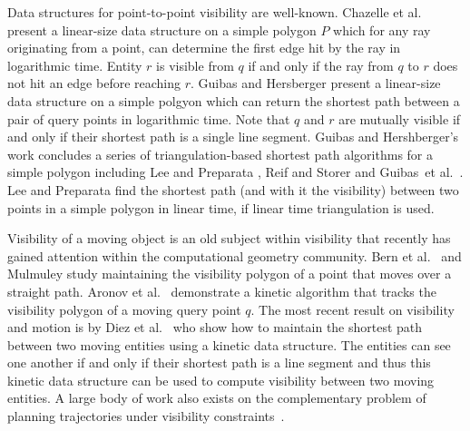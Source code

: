 \documentclass[UKenglish]{lipics-v2019}
\newcommand{\etal}{\textnormal{et al.}\xspace}
\begin{document}
Data structures for point-to-point visibility are well-known. 
Chazelle \etal~\cite{chazelle1994ray} present a linear-size data structure on a simple polygon $P$ which for any ray originating from a point, can determine the first edge hit by the ray in logarithmic time. Entity $r$ is visible from $q$ if and only if the ray from $q$ to $r$ does not hit an edge before reaching $r$. Guibas and Hersberger \cite{GUIBAS1989126} present a linear-size data structure on a simple polgyon which can return the shortest path between a pair of query points in logarithmic time. Note that $q$ and $r$ are mutually visible if and only if their shortest path is a single line segment.
Guibas and Hershberger's work concludes a series of triangulation-based shortest path algorithms for a simple polygon including Lee and Preparata \cite{LeeP84}, Reif and Storer \cite{ReifS85} and Guibas~\etal~\cite{GuibasHLST87}.
Lee and Preparata \cite{LeeP84} find the shortest path (and with it the visibility) between two points in a simple polygon in linear time, if linear time triangulation is used.


Visibility of a moving object is an old subject within visibility that recently has gained attention within the computational geometry community. Bern \etal~\cite{bern1994visibility} and  Mulmuley \cite{mulmuley1991hidden} study maintaining the visibility polygon of a point that moves over a straight path. 
Aronov \etal~\cite{aronov2002visibility} demonstrate a kinetic algorithm that tracks the visibility polygon of a moving query point $q$. The most recent result on visibility and motion is by Diez \etal~\cite{DKRRS2017KineticAPSPEuroCG} who show how to maintain the shortest path between two moving entities using a kinetic data structure. The entities can see one another if and only if their shortest path is a line segment and thus this kinetic data structure can be used to compute visibility between two moving entities. 
A large body of work also exists on the complementary problem of planning trajectories under visibility constraints~\cite {6907405}.
\end{document}
